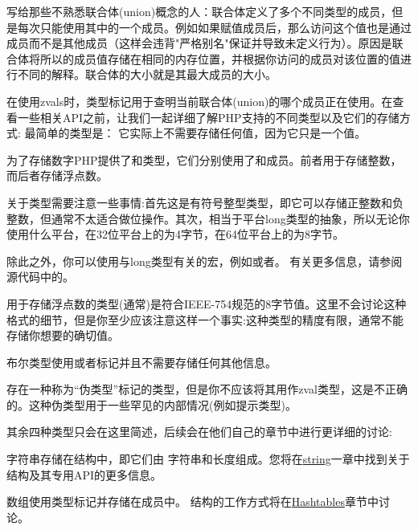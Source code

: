 写给那些不熟悉联合体(union)概念的人：联合体定义了多个不同类型的成员，但是每次只能使用其中的一个成员。例如如果赋值成员后，那么访问这个值也是通过成员而不是其他成员（这样会违背"严格别名"保证并导致未定义行为）。原因是联合体将所以的成员值存储在相同的内存位置，并根据你访问的成员对该位置的值进行不同的解释。联合体的大小就是其最大成员的大小。

在使用zvals时，类型标记用于查明当前联合体(union)的哪个成员正在使用。在查看一些相关API之前，让我们一起详细了解PHP支持的不同类型以及它们的存储方式:
最简单的类型是： 它实际上不需要存储任何值，因为它只是一个值。

为了存储数字PHP提供了和类型，它们分别使用了和成员。前者用于存储整数，而后者存储浮点数。

关于类型需要注意一些事情:首先这是有符号整型类型，即它可以存储正整数和负整数，但通常不太适合做位操作。其次，相当于平台long类型的抽象，所以无论你使用什么平台，在32位平台上的为4字节，在64位平台上的为8字节。

除此之外，你可以使用与long类型有关的宏，例如或者。 有关更多信息，请参阅源代码中的。

用于存储浮点数的类型(通常)是符合IEEE-754规范的8字节值。这里不会讨论这种格式的细节，但是你至少应该注意这样一个事实:这种类型的精度有限，通常不能存储你想要的确切值。

布尔类型使用或者标记并且不需要存储任何其他信息。

存在一种称为“伪类型”标记的类型，但是你不应该将其用作zval类型，这是不正确的。这种伪类型用于一些罕见的内部情况(例如提示类型)。

其余四种类型只会在这里简述，后续会在他们自己的章节中进行更详细的讨论:

字符串存储在结构中，即它们由 字符串和长度组成。您将在\href{http://www.phpinternalsbook.com/php7/internal_types/strings.html}{string}一章中找到关于结构及其专用API的更多信息。

数组使用类型标记并存储在成员中。 结构的工作方式将在\href{http://www.phpinternalsbook.com/php7/internal_types/hashtables.html}{Hashtables}章节中讨论。

